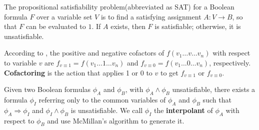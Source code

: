 \documentclass[runningheads,a4paper,orivec]{llncs}
\begin{document}

The propositional satisfiability problem(abbreviated as SAT) for a Boolean formula $F$ over a variable set $V$ 
is to find a satisfying assignment $A:V\to B$,
so that $F$ can be evaluated to $1$.
If $A$ exists, then $F$ is satisfiable;
otherwise,
it is unsatisfiable.

 



According to \cite{EFFSATUSMCCO},
the positive and negative cofactors of $f(v_1\dots v\dots v_n)$ with respect to variable
$v$ are $f_{v\equiv 1}=f(v_1\dots 1\dots v_n)$ and $f_{v\equiv 0}=f(v_1\dots 0\dots v_n)$,
respectively.
\textbf{Cofactoring} is the action that applies 1 or 0 to $v$ to get $f_{v\equiv 1}$ or $f_{v\equiv 0}$.

Given two Boolean formulas $\phi_A$ and $\phi_B$,
with $\phi_A\wedge \phi_B$ unsatisfiable,
there exists a formula $\phi_I$ referring only
to the common variables of $\phi_A$ and $\phi_B$ such that $\phi_A\Rightarrow \phi_I$
and $\phi_I\wedge \phi_B$ is unsatisfiable.
We call $\phi_I$ the \textbf{interpolant} \cite{Craig} of $\phi_A$ with respect to $\phi_B$
and use McMillan's algorithm \cite{interp_McMillan} to generate it.
\end{document}
